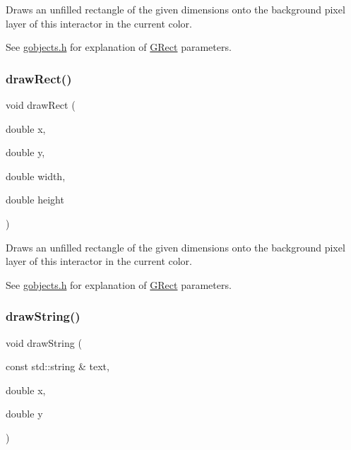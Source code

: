 Draws an unfilled rectangle of the given dimensions onto the background pixel layer of this interactor in the current color. 

See \mbox{\hyperlink{gobjects_8h_source}{gobjects.\+h}} for explanation of \mbox{\hyperlink{classsgl_1_1GRect}{G\+Rect}} parameters. \mbox{\label{classsgl_1_1GDrawingSurface_a4148e770ffc5474153aadd4814dbd708}} 
\subsubsection{\texorpdfstring{draw\+Rect()}{drawRect()}\hspace{0.1cm}{\footnotesize\ttfamily [2/2]}}
{\footnotesize\ttfamily void draw\+Rect (\begin{DoxyParamCaption}\item[{double}]{x,  }\item[{double}]{y,  }\item[{double}]{width,  }\item[{double}]{height }\end{DoxyParamCaption})\hspace{0.3cm}{\ttfamily [virtual]}}



Draws an unfilled rectangle of the given dimensions onto the background pixel layer of this interactor in the current color. 

See \mbox{\hyperlink{gobjects_8h_source}{gobjects.\+h}} for explanation of \mbox{\hyperlink{classsgl_1_1GRect}{G\+Rect}} parameters. \mbox{\label{classsgl_1_1GDrawingSurface_ad4e8551a753a77135792bbee97013675}} 
\subsubsection{\texorpdfstring{draw\+String()}{drawString()}}
{\footnotesize\ttfamily void draw\+String (\begin{DoxyParamCaption}\item[{const std\+::string \&}]{text,  }\item[{double}]{x,  }\item[{double}]{y }\end{DoxyParamCaption})\hspace{0.3cm}{\ttfamily [virtual]}}



